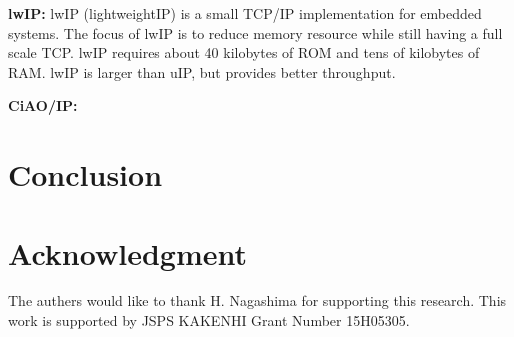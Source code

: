 \documentclass[conference]{IEEEtran/IEEEtran}
\begin{document}
{\bf lwIP:}
lwIP (lightweightIP) is a small TCP/IP implementation for embedded systems.
The focus of lwIP is to reduce memory resource while still having a full scale TCP.
lwIP requires about 40 kilobytes of ROM and tens of kilobytes of RAM.
lwIP is larger than uIP, but provides better throughput.

{\bf CiAO/IP:}


\section{Conclusion}
\label{sec:Conclusion}



\section*{Acknowledgment}

The authers would like to thank H. Nagashima for supporting this research.
This work is supported by JSPS KAKENHI Grant Number 15H05305.





\end{document}
